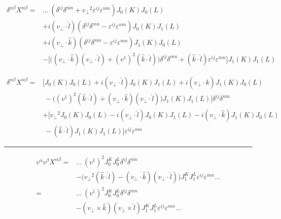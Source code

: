 \begin{equation*}
\begin{split}
\delta^{\alpha \beta} X^{\alpha \beta}=& ...~ (\delta^{ij} \delta^{mn} + {v_\perp}^2 \varepsilon^{ij} \varepsilon^{mn}) J_0 (K) J_0(L) \\
& + i (v_\perp \cdot \hat{l}) (\delta^{ij} \delta^{mn} - \varepsilon^{ij} \varepsilon^{mn}) J_0 (K) J_1(L) \\
& + i (v_\perp \cdot \hat{k}) (\delta^{ij} \delta^{mn} - \varepsilon^{ij} \varepsilon^{mn}) J_1 (K) J_0(L) \\
& - \bigg[ \Big((v_\perp \cdot \hat{k}) (v_\perp \cdot \hat{l}) + (v^1)^2 (\hat{k} \cdot \hat{l}) \Big) \delta^{ij} \delta^{mn} + (\hat{k} \cdot \hat{l}) \varepsilon^{ij}\varepsilon^{mn} \bigg] J_1 (K) J_1(L) \end{split}
\end{equation*}

\begin{equation*}
\begin{split}
\delta^{\alpha \beta} X^{\alpha \beta} = & \Big[ J_0(K) J_0(L) + i(v_\perp \cdot \hat{l}) J_0(K) J_1(L) + i(v_\perp \cdot \hat{k}) J_1(K) J_0(L)\\
& ~ -\Big((v^1)^2 (\hat{k} \cdot \hat{l})+(v_\perp \cdot \hat{k}) (v_\perp \cdot \hat{l}) \Big)J_1(K) J_1(L) \Big] \delta^{ij} \delta^{mn}\\
& + \Big[ {v_\perp}^2 J_0(K)J_0(L) - i (v_\perp \cdot \hat{l}) J_0(K) J_1(L) - i (v_\perp \cdot \hat{k}) J_1(K) J_0(L)\\
& ~ - (\hat{k} \cdot \hat{l}) J_1(K) J_1(L) \Big] \varepsilon^{ij} \varepsilon^{mn}
\end{split}
\end{equation*}

\hrule

\begin{equation*}
\begin{split}
v^\alpha v^\beta X^{\alpha \beta} = & ...~ (v^1)^2 J_0 ^K J_0^L \delta^{ij} \delta^{mn} \\
& - \Big( {v_\perp}^2 (\hat{k} \cdot \hat{l}) - (v_\perp \cdot \hat{k})(v_\perp \cdot \hat{l})\Big) J_1 ^K J_1^L \varepsilon^{ij} \varepsilon^{mn} ... \\
= & ...~ (v^1)^2 J_0 ^K J_0^L \delta^{ij} \delta^{mn} \\
& - (v_\perp \times \hat{k})(v_\perp \times \hat{l}) J_1 ^K J_1^L \varepsilon^{ij} \varepsilon^{mn} ...
\end{split}
\end{equation*}


